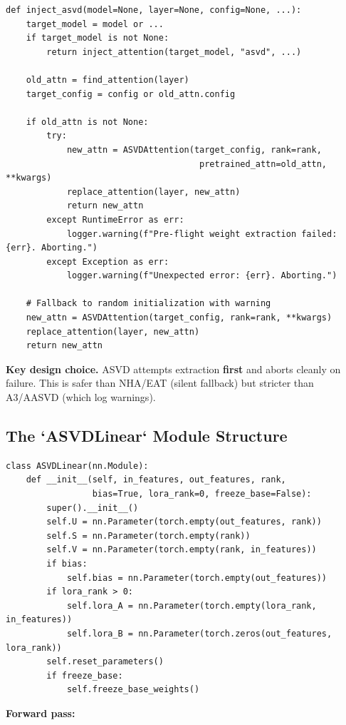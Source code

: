 \begin{lstlisting}
def inject_asvd(model=None, layer=None, config=None, ...):
    target_model = model or ...
    if target_model is not None:
        return inject_attention(target_model, "asvd", ...)
    
    old_attn = find_attention(layer)
    target_config = config or old_attn.config
    
    if old_attn is not None:
        try:
            new_attn = ASVDAttention(target_config, rank=rank,
                                      pretrained_attn=old_attn, **kwargs)
            replace_attention(layer, new_attn)
            return new_attn
        except RuntimeError as err:
            logger.warning(f"Pre-flight weight extraction failed: {err}. Aborting.")
        except Exception as err:
            logger.warning(f"Unexpected error: {err}. Aborting.")
    
    # Fallback to random initialization with warning
    new_attn = ASVDAttention(target_config, rank=rank, **kwargs)
    replace_attention(layer, new_attn)
    return new_attn
\end{lstlisting}

\textbf{Key design choice.} ASVD attempts extraction \textbf{first} and aborts 
cleanly on failure. This is safer than NHA/EAT (silent fallback) but 
stricter than A3/AASVD (which log warnings).

\subsection{The `ASVDLinear` Module Structure}

\begin{lstlisting}
class ASVDLinear(nn.Module):
    def __init__(self, in_features, out_features, rank,
                 bias=True, lora_rank=0, freeze_base=False):
        super().__init__()
        self.U = nn.Parameter(torch.empty(out_features, rank))
        self.S = nn.Parameter(torch.empty(rank))
        self.V = nn.Parameter(torch.empty(rank, in_features))
        if bias:
            self.bias = nn.Parameter(torch.empty(out_features))
        if lora_rank > 0:
            self.lora_A = nn.Parameter(torch.empty(lora_rank, in_features))
            self.lora_B = nn.Parameter(torch.zeros(out_features, lora_rank))
        self.reset_parameters()
        if freeze_base:
            self.freeze_base_weights()
\end{lstlisting}

\textbf{Forward pass:}

